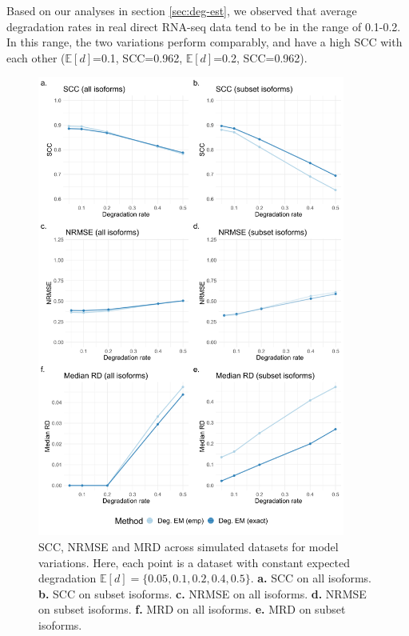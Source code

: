 Based on our analyses in section \ref{sec:deg-est}, we observed that average degradation rates in real direct RNA-seq data tend to be in the range of 0.1-0.2. In this range, the two variations perform comparably, and have a high SCC with each other ($\mathbb{E}[d]$=0.1, SCC=0.962, $\mathbb{E}[d]$=0.2, SCC=0.962).  

\begin{figure}[H]
    \centering
    \includegraphics[width=0.9\textwidth]{figures/sec-4-1-scc-nrmse.png}
    \caption[SCC, NRMSE and MRD across simulated datasets for model variations]{SCC, NRMSE and MRD across simulated datasets for model variations. Here, each point is a dataset with constant expected degradation $\mathbb{E}[d]=\{0.05,0.1,0.2,0.4,0.5\}$. \textbf{a.} SCC on all isoforms. \textbf{b.} SCC on subset isoforms. \textbf{c.} NRMSE on all isoforms. \textbf{d.} NRMSE on subset isoforms. \textbf{f.} MRD on all isoforms. \textbf{e.} MRD on subset isoforms.}
    \label{fig:4-1-scc-nrmse}
\end{figure}

